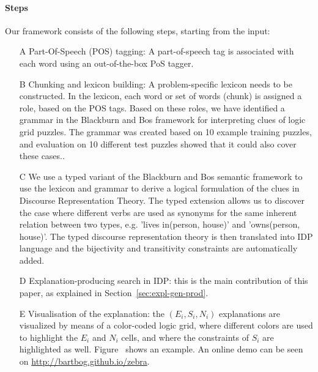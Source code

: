 \paragraph{Steps} Our framework consists of the following steps, starting from the input:
\begin{enumerate}\setlength\itemsep{-0.2em}
	\item[A] Part-Of-Speech (POS) tagging: A part-of-speech tag is associated with each word using an out-of-the-box PoS tagger.\\
	\item[B] Chunking and lexicon building: A problem-specific lexicon needs to be constructed. In the lexicon, each word or set of words (chunk) is assigned a role, based on the POS tags. Based on these roles, we have identified a grammar in the Blackburn and Bos framework for interpreting clues of logic grid puzzles. The grammar was created based on 10 example training puzzles, and evaluation on 10 different test puzzles showed that it could also cover these cases..\\
	\item[C] We use a typed variant of the Blackburn and Bos semantic framework to use the lexicon and grammar to derive a logical formulation of the clues in Discourse Representation Theory. The typed extension allows us to discover the case where different verbs are used as synonyms for the same inherent relation between two types, e.g. 'lives in(person, house)' and 'owns(person, house)'. The typed discourse representation theory is then translated into IDP language and the bijectivity and transitivity constraints are automatically added. \\
	\item[D] Explanation-producing search in IDP: this is the main contribution of this paper, as explained in Section~\ref{sec:expl-gen-prod}.\\
	\item[E] Visualisation of the explanation: the $(E_i, S_i, N_i)$ explanations are visualized by means of a color-coded logic grid, where different colors are used to highlight the $E_i$ and $N_i$ cells, and where the constraints of $S_i$ are highlighted as well. Figure~ shows an example. An online demo can be seen on \url{http://bartbog.github.io/zebra}. 
\end{enumerate}

